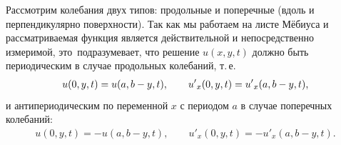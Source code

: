 Рассмотрим колебания двух типов: продольные и поперечные (вдоль и перпендикулярно поверхности). Так как мы работаем на листе Мёбиуса и рассматриваемая функция является действительной и непосредственно измеримой, это~подразумевает, что решение $u(x,y,t)$ должно быть периодическим в случае продольных колебаний, т.\,е.
\begin{eqnarray}\label{longitudinal}
u(0,y,t)=u(a,b-y,t), \qquad
u{\bf'}_x(0,y,t)=u{\bf'}_x(a,b-y,t),
\end{eqnarray}
и антипериодическим по переменной $x$ с периодом $a$ в случае поперечных колебаний:
\begin{eqnarray}\label{transversal}
u(0,y,t)=-u(a,b-y,t), \qquad
u'_x(0,y,t)=-u'_x(a,b-y,t).
\end{eqnarray}


